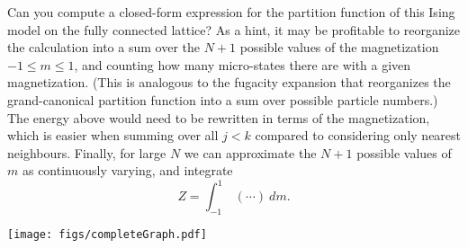 \documentclass[12 pt]{article} %
\begin{document}
Can you compute a closed-form expression for the partition function of this Ising model on the fully connected lattice?
As a hint, it may be profitable to reorganize the calculation into a sum over the $N + 1$ possible values of the magnetization $-1 \leq m \leq 1$, and counting how many micro-states there are with a given magnetization.
(This is analogous to the fugacity expansion that reorganizes the grand-canonical partition function into a sum over possible particle numbers.)
The energy above would need to be rewritten in terms of the magnetization, which is easier when summing over all $j < k$ compared to considering only nearest neighbours.
Finally, for large $N$ we can approximate the $N + 1$ possible values of $m$ as continuously varying, and integrate
\begin{equation*}
  Z = \int_{-1}^1 \ (\cdots) \ dm.
\end{equation*}

\begin{center}\texttt{[image: figs/completeGraph.pdf]}\end{center}
\end{document}
